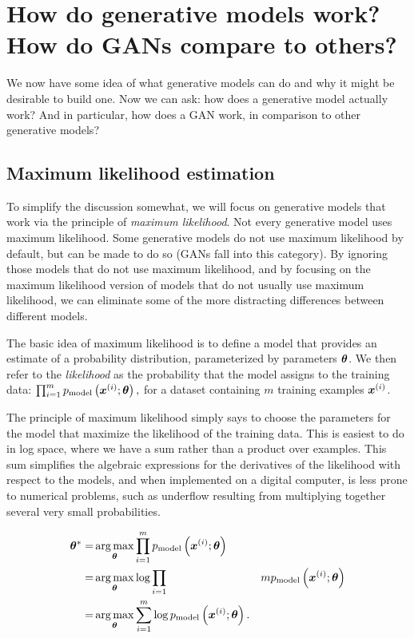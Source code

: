 \section{How do generative models work? How do GANs compare to others?}
\label{sec:tree}

We now have some idea of what generative models can do and why it might be
desirable to build one.
Now we can ask: how does a generative model actually work? And in particular,
how does a GAN work, in comparison to other generative models?

\subsection{Maximum likelihood estimation}

To simplify the discussion somewhat, we will focus on generative models
that work via the principle of {\em maximum likelihood}.
Not every generative model uses maximum likelihood.
Some generative models do not use maximum likelihood by default, but
can be made to do so (GANs fall into this category).
By ignoring those models that do not use maximum likelihood, and
by focusing on the maximum likelihood version of models that do not
usually use maximum likelihood, we can eliminate some of the more 
distracting differences between different models.

The basic idea of maximum likelihood is to define a model that provides
an estimate of a probability distribution, parameterized by parameters
${\bm{\theta}}$.
We then refer to the {\em likelihood} as the probability that the model
assigns to the training data: $\prod_{i=1}^m p_{\rm{model}}\left({\bm{x}}^{(i)}; {\bm{\theta}} \right),$
for a dataset containing $m$ training examples ${\bm{x}}^{(i)}$.

The principle of maximum likelihood simply says to choose the parameters for the model
that maximize the likelihood of the training data.
This is easiest to do in log space, where we have a sum rather than a product
over examples.
This sum simplifies the algebraic expressions for the derivatives of the likelihood
with respect to the models, and when implemented on a digital computer, is less
prone to numerical problems, such as underflow resulting from multiplying together
several very small probabilities.

\begin{align}
{\bm{\theta}}^* =& \operatorname*{arg\,max}_{\bm{\theta}} \prod_{i=1}^m p_{\rm{model}}\left({\bm{x}}^{(i)}; {\bm{\theta}} \right) \\
  =& \operatorname*{arg\,max}_{\bm{\theta}} \log \prod_{i=1}&m p_{\rm{model}}\left({\bm{x}}^{(i)}; {\bm{\theta}} \right) \label{eq:log} \\
          =& \operatorname*{arg\,max}_{\bm{\theta}} \sum_{i=1}^m \log p_{\rm{model}}\left({\bm{x}}^{(i)}; {\bm{\theta}} \right).
\end{align}

